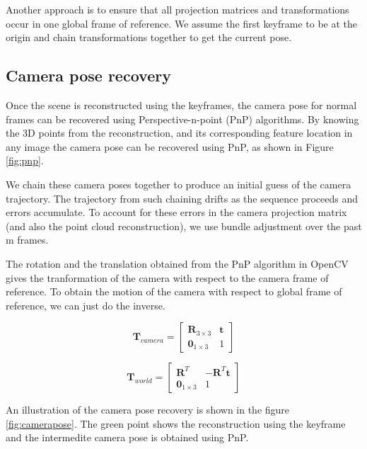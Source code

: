 \documentclass{article}
\begin{document}
Another approach is to ensure that all projection matrices and transformations occur in one global frame of reference. We assume the first keyframe to be at the origin and chain transformations together to get the current pose.

\subsection{Camera pose recovery}
Once the scene is reconstructed using the keyframes, the camera pose for normal frames can be recovered using Perspective-n-point (PnP) algorithms. By knowing the 3D points from the reconstruction, and its corresponding feature location in any image the camera pose can be recovered using PnP, as shown in Figure \ref{fig:pnp}.

We chain these camera poses together to produce an initial guess of the camera trajectory. The trajectory from such chaining drifts as the sequence proceeds and errors accumulate. To account for these errors in the camera projection matrix (and also the point cloud reconstruction), we use bundle adjustment over the past m frames.

The rotation and the translation obtained from the PnP algorithm in OpenCV gives the tranformation of the camera with respect to the camera frame of reference. To obtain the motion of the camera with respect to global frame of reference, we can just do the inverse.

$$ \textbf{T}_{camera}  = \begin{bmatrix}
\textbf{R}_{3\times3} & \textbf{t} \\
\textbf{0}_{1\times3} & 1
\end{bmatrix} $$

$$ \textbf{T}_{world}  = \begin{bmatrix}
\textbf{R}^T  & -\textbf{R}^T \textbf{t}\\
\textbf{0}_{1\times3} & 1
\end{bmatrix} $$


An illustration of the camera pose recovery is shown in the figure \ref{fig:camerapose}. The green point shows the reconstruction using the keyframe and the intermedite camera pose is obtained using PnP.
\end{document}
